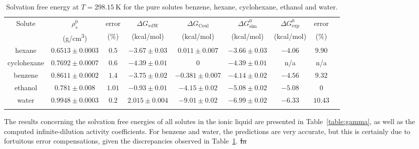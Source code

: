 \documentclass[3p,twocolumn]{elsarticle}
\providecommand{\DIFdel}[1]{{\protect\color{red}\sout{#1}}}                      %
\providecommand{\DIFaddbegin}{} %
\providecommand{\DIFdelbegin}{} %
\providecommand{\DIFdelend}{} %
\newcommand{\DIFscaledelfig}{0.5}
\newlength{\DIFdelgraphicswidth} %
\newlength{\DIFdelgraphicsheight} %
\newcommand{\DIFaddincludegraphics}[2][]{{\color{blue}\fbox{\DIFOincludegraphics[#1]{#2}}}} %
\newcommand{\DIFdelincludegraphics}[2][]{%
\sbox{\DIFdelgraphicsbox}{\DIFOincludegraphics[#1]{#2}}%
\settoboxwidth{\DIFdelgraphicswidth}{\DIFdelgraphicsbox} %
\settoboxtotalheight{\DIFdelgraphicsheight}{\DIFdelgraphicsbox} %
\scalebox{\DIFscaledelfig}{%
\parbox[b]{\DIFdelgraphicswidth}{\usebox{\DIFdelgraphicsbox}\\[-\baselineskip] \rule{\DIFdelgraphicswidth}{0em}}\llap{\resizebox{\DIFdelgraphicswidth}{\DIFdelgraphicsheight}{%
\setlength{\unitlength}{\DIFdelgraphicswidth}%
\begin{picture}(1,1)%
\thicklines\linethickness{2pt} %
{\color[rgb]{1,0,0}\put(0,0){\framebox(1,1){}}}%
{\color[rgb]{1,0,0}\put(0,0){\line( 1,1){1}}}%
{\color[rgb]{1,0,0}\put(0,1){\line(1,-1){1}}}%
\end{picture}%
}\hspace*{3pt}}} %
} %
\DeclareRobustCommand{\DIFaddbegin}{\DIFOaddbegin \let\includegraphics\DIFaddincludegraphics} %
\DeclareRobustCommand{\DIFdelbegin}{\DIFOdelbegin \let\includegraphics\DIFdelincludegraphics} %
\DeclareRobustCommand{\DIFdelend}{\DIFOaddend \let\includegraphics\DIFOincludegraphics} %
\begin{document}
\begin{table}
	\centering
	\caption{Solvation free energy at $T = 298.15~\text{K}$ for the pure solutes benzene, hexane, cyclohexane, ethanol and water.}
	\begin{adjustbox}{max width=\textwidth}
		\begin{tabular}{ccccccccc}
			\hline\hline
			Solute & $\rho^0_s$ & error & $\Delta G_\text{vdW}$  & $\Delta G_\text{Coul}$  & $\Delta G^0_\text{sim}$ & $\Delta G^0_\text{exp}$   & error \\
			& (g/cm\textsuperscript{3}) & (\%) & (kcal/mol) &  (kcal/mol) &  (kcal/mol)   & (kcal/mol)   & (\%) \\
			\hline
			hexane & $0.6513 \pm 0.0003$ & $0.5$ & $-3.67  \pm  0.03$ & $0.011 \pm 0.007$ & $-3.66 \pm 0.03$ & $-4.06$ & $9.90$ \\
			cyclohexane & $0.7692 \pm 0.0007$ & $0.6$ & $-4.39 \pm 0.01$ & $0$ & $-4.39 \pm 0.01$ & n/a & n/a  \\
			benzene & $0.8611 \pm 0.0002$ & $1.4$ & $-3.75  \pm 0.02$ & $-0.381 \pm 0.007$ & $-4.14 \pm 0.02$ & $-4.56$ & $9.32$  \\
			ethanol & $0.781 \pm 0.008$ & $1.01$  & $-0.93 \pm 0.01$ & $-4.15 \pm 0.02$  & $-5.08  \pm 0.02$  & $-5.08$ & $0$ \\
			water & $0.9948 \pm 0.0003$ & $0.2$ & $2.015 \pm 0.004$ & $-9.01 \pm 0.02$ & $-6.99 \pm 0.02$ & $-6.33$  & $10.43$ \\
			\hline\hline
			\label{table:mu_solutes} 
		\end{tabular}
	\end{adjustbox}
\end{table}

The results concerning the solvation free energies of all solutes in the ionic liquid are presented in Table~\ref{table:gamma}, as well as the computed infinite-dilution activity coefficients.
For benzene and water, the predictions are very accurate, but this is certainly due to fortuitous error compensations, given the discrepancies observed in Table~\ref{table:mu_solutes}.
\DIFdelbegin \DIFdel{In }\DIFdelend \DIFaddbegin 
\end{document}
